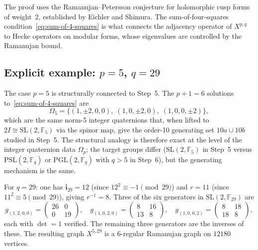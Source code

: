 \documentclass[11pt,a4paper]{article}
\begin{document}
    The proof uses the Ramanujan--Petersson conjecture for holomorphic cusp
    forms of weight~2, established by Eichler and Shimura.
    The sum-of-four-squares condition~\eqref{eq:sum-of-4-squares} is what
    connects the adjacency operator of $X^{p,q}$ to Hecke operators on
    modular forms, whose eigenvalues are controlled by the Ramanujan bound.

  \subsection{Explicit example: $p = 5$, $q = 29$}
    \label{sec:step6a-p5q29}

    The case $p = 5$ is structurally connected to Step~5.
    The $p+1 = 6$ solutions to~\eqref{eq:sum-of-4-squares} are
    \begin{equation}
      \Omega_5 = \bigl\{
      (1, \pm 2, 0, 0),\;
      (1, 0, \pm 2, 0),\;
      (1, 0, 0, \pm 2)
      \bigr\},
      \label{eq:omega5}
    \end{equation}
    which are the same norm-5 integer quaternions that, when lifted to
    $2I \cong \mathrm{SL}(2,\mathbb{F}_5)$ via the spinor map, give the
    order-10 generating set $10a \cup 10b$ studied in Step~5.
    The structural analogy is therefore exact at the level of the integer
    quaternion data $\Omega_p$; the target groups differ ($\mathrm{SL}(2,
\mathbb{F}_5)$ in Step~5 versus $\mathrm{PSL}(2,\mathbb{F}_q)$ or
    $\mathrm{PGL}(2,\mathbb{F}_q)$ with $q > 5$ in Step~6), but the
    generating mechanism is the same.

    For $q = 29$: one has $\mathbf{i}_{29} = 12$ (since $12^2 \equiv -1
\pmod{29}$) and $r = 11$ (since $11^2 \equiv 5 \pmod{29}$), giving
    $r^{-1} = 8$.
    Three of the six generators in $\mathrm{SL}(2,\mathbb{F}_{29})$ are
    \begin{equation}
      g_{(1,2,0,0)} =
      \begin{pmatrix} 26 & 0 \\ 0 & 19 \end{pmatrix}, \quad
      g_{(1,0,2,0)} =
      \begin{pmatrix} 8 & 16 \\ 13 & 8 \end{pmatrix}, \quad
      g_{(1,0,0,2)} =
      \begin{pmatrix} 8 & 18 \\ 18 & 8 \end{pmatrix},
      \label{eq:generators-p5q29}
    \end{equation}
    each with $\det = 1$ verified.
    The remaining three generators are the inverses of these.
    The resulting graph $X^{5,29}$ is a 6-regular Ramanujan graph on
    $12180$ vertices.
\end{document}
